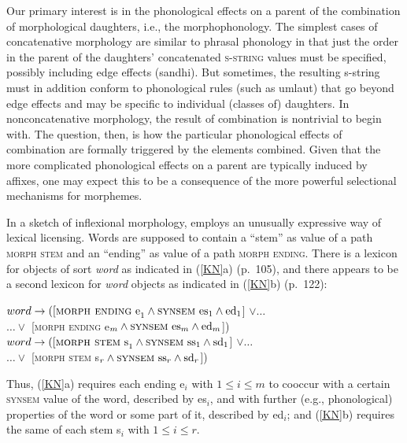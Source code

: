\documentclass[output=paper]{langsci/langscibook}
\begin{document}
Our primary interest is in the phonological effects on a parent of the
combination of morphological daughters, i.e., the morphophonology.  The
simplest cases of concatenative morphology are similar to phrasal 
phonology in that just the order in the parent of the daughters'
concatenated \textsc{s-string} values must be specified, possibly including
edge effects (sandhi). But sometimes, the resulting s-string must in
addition conform to phonological rules (such as umlaut) that go beyond edge
effects and may be specific to individual (classes of) daughters. In
nonconcatenative morphology, the result of combination is nontrivial to
begin with. The question, then, is how the particular phonological effects
of combination are formally triggered by the elements combined. Given that
the more complicated phonological effects on a parent are typically induced
by affixes, one may expect this to be a consequence of the more powerful
selectional mechanisms for morphemes.

In a sketch of inflexional morphology, \cite{kri:ner:93} employs an unusually expressive way of
lexical licensing. Words are supposed to contain a ``stem'' as value of a
path \textsc{morph stem} and an ``ending'' as value of a path \textsc{morph
  ending}. There is a lexicon for objects of sort \textit{word}\/ as indicated
in (\ref{KN}a) (p.~105), and there appears to be a second lexicon for \textit{word}\/ objects as indicated in (\ref{KN}b) (p.~122):
%
\begin{exe}
\ex
\label{KN}
\begin{xlist}
\ex
$word  \rightarrow   \mbox{([\textsc{morph ending} e}_1 \wedge  
\mbox{\textsc{synsem} es}_1 \wedge \mbox{ed}_1$] $\vee\ldots$ \hfill \\ 
        \hspace*{6em} $\ldots{} \vee$ [\textsc{morph ending} e$_m \wedge \mbox{\textsc{synsem} es}_m \wedge \mbox{ed}_m$])
%
\ex
$word  \rightarrow   \mbox{([\textsc{morph stem} s}_1 \wedge  
\mbox{\textsc{synsem} ss}_1 \wedge \mbox{sd}_1$] $\vee\ldots$ \hfill \\ 
        \hspace*{6em} $\ldots{} \vee$ [\textsc{morph stem} s$_r \wedge \mbox{\textsc{synsem} ss}_r \wedge \mbox{sd}_r$])
\end{xlist}
\end{exe}
% 
Thus, (\ref{KN}a) requires each ending e$_i$ with $1\le i\le m$\/ to
cooccur with a certain \textsc{synsem} value of the word, described by
es$_i$\/, and with further (e.g., phonological) properties of the word or
some part of it, described by ed$_i$\/; and (\ref{KN}b) requires the same
of each stem s$_i$ with $1\le i\le r$.
\end{document}
